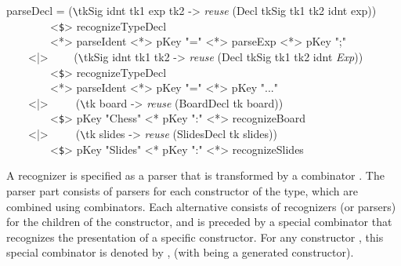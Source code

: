 \ttfamily \begin{small} \begin{tabbing}
parseDecl = (\verb|\|tkSig idnt tk1 exp tk2 -> {\em reuse} (Decl tkSig tk1 tk2 idnt exp))\\
~~~~~~~~<\verb|$|> recognizeTypeDecl\\
~~~~~~~~<*> parseIdent <*> pKey "=" <*> parseExp <*> pKey ";"\\
~~~~<|>~~~~ (\verb|\|tkSig idnt tk1 tk2 -> {\em reuse} (Decl tkSig tk1 tk2 idnt {\em Exp}))\\
~~~~~~~~<\verb|$|> recognizeTypeDecl\\
~~~~~~~~<*> parseIdent <*> pKey "=" <*> pKey "..."\\
~~~~<|>~~~~~(\verb|\|tk board -> {\em reuse} (BoardDecl tk board))\\
~~~~~~~~<\verb|$|> pKey "Chess" <* pKey ":" <*> recognizeBoard\\
~~~~<|>~~~~~(\verb|\|tk slides -> {\em reuse} (SlidesDecl tk slides))\\
~~~~~~~~<\verb|$|> pKey "Slides" <* pKey ":" <*> recognizeSlides
\end{tabbing} \end{small} \rmfamily






A recognizer is specified as a parser that is transformed by a combinator . The parser part consists of parsers for each constructor of the type, which are combined using \p{<|>} combinators. Each alternative consists of recognizers (or parsers) for the children of the constructor, and is preceded by a special combinator that recognizes the presentation of a specific constructor. For any constructor , this special combinator is denoted by , (with  being a generated constructor).

